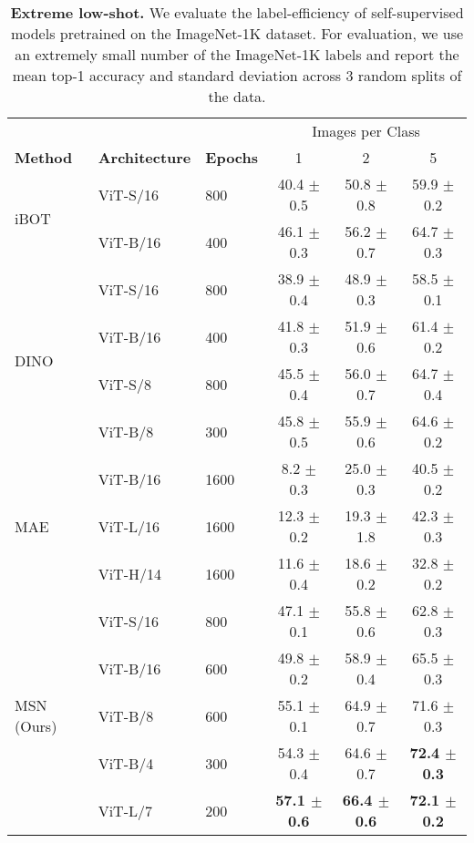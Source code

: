 \documentclass{article}
\begin{document}
\begin{table}[t]
    \centering
    \caption{\textbf{Extreme low-shot.} We evaluate the label-efficiency of self-supervised models pretrained on the ImageNet-1K dataset. For evaluation, we use an extremely small number of the ImageNet-1K labels and report the mean top-1 accuracy and standard deviation across 3 random splits of the data.}
    \label{tb:lowshot}
    \begin{tabular}{l l l c c c}
& & & \multicolumn{3}{c}{\small Images per Class}\\
        \bf\small Method & \bf\small Architecture & \bf\small Epochs & 1 & 2 & 5 \\\toprule
        \multirow{2}{*}{iBOT~\citep{zhou2021ibot}} & ViT-S/16 & 800 & 40.4 $\pm$ 0.5 & 50.8 $\pm$ 0.8 & 59.9 $\pm$ 0.2 \\
        & ViT-B/16 & 400 & 46.1 $\pm$ 0.3 & 56.2 $\pm$ 0.7 & 64.7 $\pm$ 0.3 \\[3mm]
        \multirow{4}{*}{DINO~\citep{caron2021emerging}} & ViT-S/16 & 800 & 38.9 $\pm$ 0.4 & 48.9 $\pm$ 0.3 & 58.5 $\pm$ 0.1 \\
        & ViT-B/16 & 400 & 41.8 $\pm$ 0.3 & 51.9 $\pm$ 0.6 & 61.4 $\pm$ 0.2 \\[1mm]
        & ViT-S/8 & 800 & 45.5 $\pm$ 0.4 & 56.0 $\pm$ 0.7 & 64.7 $\pm$ 0.4 \\
        & ViT-B/8 & 300 & 45.8 $\pm$ 0.5 & 55.9 $\pm$ 0.6 & 64.6 $\pm$ 0.2 \\[3mm]
        \multirow{3}{*}{MAE~\citep{he2021masked}} & ViT-B/16 & 1600 & 8.2 $\pm$ 0.3 & 25.0 $\pm$ 0.3 & 40.5 $\pm$ 0.2 \\
        & ViT-L/16 & 1600 & 12.3 $\pm$ 0.2 & 19.3 $\pm$ 1.8 & 42.3 $\pm$ 0.3 \\[1mm]
        & ViT-H/14 & 1600 & 11.6 $\pm$ 0.4 & 18.6 $\pm$ 0.2 & 32.8 $\pm$ 0.2 \\ \midrule
        \multirow{5}{*}{MSN (Ours)} & ViT-S/16 & 800 & 47.1 $\pm$ 0.1 & 55.8 $\pm$ 0.6 & 62.8 $\pm$ 0.3 \\
        & ViT-B/16 & 600 & 49.8 $\pm$ 0.2 & 58.9 $\pm$ 0.4 & 65.5 $\pm$ 0.3 \\[1mm]
& ViT-B/8 & 600 & 55.1 $\pm$ 0.1 & 64.9 $\pm$ 0.7 & 71.6 $\pm$ 0.3 \\
        & ViT-B/4 & 300 & 54.3 $\pm$ 0.4 & 64.6 $\pm$ 0.7 & \cellcolor{fbApp}\bf 72.4 $\pm$ 0.3 \\[1mm]
        & ViT-L/7 & 200 & \cellcolor{fbApp}\bf 57.1 $\pm$ 0.6 & \cellcolor{fbApp}\bf 66.4 $\pm$ 0.6 & \cellcolor{fbApp}\bf 72.1 $\pm$ 0.2 \\
        \bottomrule
    \end{tabular}
\end{table}
\end{document}
